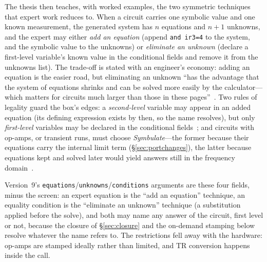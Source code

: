 \documentclass[11pt,oneside]{report}
\newcommand{\code}[1]{\texttt{#1}}
\begin{document}
The thesis then teaches, with worked examples, the two symmetric
techniques that expert work reduces to. When a circuit carries one
symbolic value and one known measurement, the generated system has
$n$ equations and $n{+}1$ unknowns, and the expert may either
\emph{add an equation} (append \code{and ir3=4} to the system, and
the symbolic value to the unknowns) or \emph{eliminate an unknown}
(declare a first-level variable's known value in the conditional
fields and remove it from the unknowns list). The trade-off is
stated with an engineer's economy: adding an equation is the easier
road, but eliminating an unknown ``has the advantage that the system
of equations shrinks and can be solved more easily by the
calculator---which matters for circuits much larger than those in
these pages''~\cite[\S4.3]{thesis2000}. Two rules of legality guard
the box's edges: a \emph{second-level} variable may appear in an
added equation (its defining expression exists by then, so the name
resolves), but only \emph{first-level} variables may be declared in
the conditional fields~\cite[\S4.3.2]{thesis2000}; and circuits with
op-amps, or transient runs, must choose \emph{Symbulate}---the
former because their equations carry the internal limit term
(\S\ref{sec:portchanges}), the latter because equations kept and
solved later would yield answers still in the frequency
domain~\cite[\S9.4.1--9.4.2]{thesis2000}.

Version~9's \code{equations}/\code{unknowns}/\code{conditions}
arguments are these four fields, minus the screen: an expert
equation is the ``add an equation'' technique, an equality condition
is the ``eliminate an unknown'' technique (a substitution applied
before the solve), and both may name any answer of the circuit,
first level or not, because the closure of \S\ref{sec:closure} and
the on-demand stamping below resolve whatever the name refers to.
The restrictions fell away with the hardware: op-amps are stamped
ideally rather than limited, and TR conversion happens inside the
call.
\end{document}

